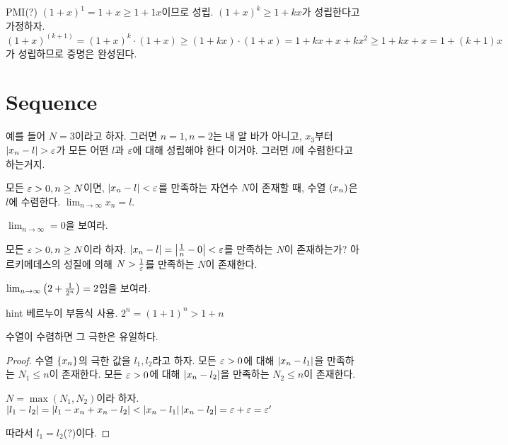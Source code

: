 \begin{solution}
  PMI(?) $(1 + x)^1 = 1 + x \ge 1 + 1x$이므로 성립.
  $(1 + x)^k \ge 1 + kx$가 성립한다고 가정하자.
  $(1 + x)^(k+1) = (1 + x)^k \cdot (1 + x) \ge (1 + kx) \cdot (1 + x)
    = 1 + kx + x + kx^2 \ge 1 + kx + x = 1 + (k + 1)x$가 성립하므로 증명은 완성된다.
\end{solution}

\section{Sequence}
예를 들어 $N = 3$이라고 하자. 그러면 $n = 1, n = 2$는 내 알 바가 아니고, $x_3$부터
$\left| x_n - l \right| > \varepsilon$가 모든 어떤 $l$과 $\varepsilon$에 대해 성립해야 한다 이거야. 그러면 $l$에 수렴한다고 하는거지.
\begin{definition}
  모든 $\varepsilon > 0, n \ge N$이면, $\left| x_n - l \right| < \varepsilon$를 만족하는 자연수 $N$이 존재할 때,
  수열 $\left( x_n \right)$은 $l$에 수렴한다. $\lim_{n \to \infty}x_n = l$.
  \label{def:sequence}
\end{definition}

\begin{exercise}
  $\lim_{n \to \infty} = 0$을 보여라.
\end{exercise}

\begin{solution}
  모든 $\varepsilon > 0, n \ge N$이라 하자. $\left| x_n - l \right| = \left| \frac{1}{n} - 0 \right| < \varepsilon$를 만족하는
  $N$이 존재하는가? 아르키메데스의 성질에 의해 $N > \frac{1}{\varepsilon}$를 만족하는 $N$이 존재한다.
\end{solution}

\begin{exercise}
  $\lim_{n \to \infty} \left( 2 + \frac{1}{2^n} \right) = 2$임을 보여라.
\end{exercise}

hint 베르누이 부등식 사용. $2^n =  (1 + 1)^n > 1 + n$

\begin{theorem}
  수열이 수렴하면 그 극한은 유일하다.
  \label{thm:sequence}
\end{theorem}

\begin{proof}
  수열 $\{x_n\}$의 극한 값을 $l_1, l_2$라고 하자.
  모든 $\varepsilon > 0$에 대해 $\left| x_n - l_1 \right|$을 만족하는 $N_1 \le n$이 존재한다.
  모든 $\varepsilon > 0$에 대해 $\left| x_n - l_2 \right|$을 만족하는 $N_2 \le n$이 존재한다.

  $N = \max(N_1, N_2)$이라 하자.
  $\left| l_1 - l_2 \right| = \left| l_1 - x_n + x_n - l_2 \right|
    < \left| x_n - l_1 \right| \left| x_n - l_2 \right| = \varepsilon + \varepsilon = \varepsilon'$

  따라서 $l_1 = l_2$(?)이다.
\end{proof}